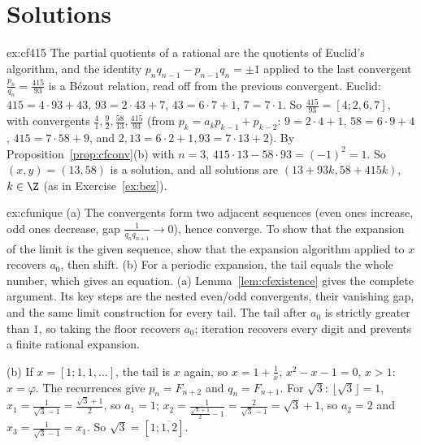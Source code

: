 \section{Solutions}

\begin{solution}{ex:cf415}
\idea The partial quotients of a rational are the quotients of Euclid's algorithm, and the identity $p_nq_{n-1}-p_{n-1}q_n=\pm1$ applied to the last convergent $\frac{p_n}{q_n}=\frac{415}{93}$ is a B\'ezout relation, read off from the previous convergent.
\writeup Euclid: $415=4\cdot93+43$, $93=2\cdot43+7$, $43=6\cdot7+1$, $7=7\cdot1$. So $\frac{415}{93}=[4;2,6,7]$, with convergents $\frac41,\frac92,\frac{58}{13},\frac{415}{93}$ (from $p_k=a_kp_{k-1}+p_{k-2}$: $9=2\cdot4+1$, $58=6\cdot9+4$, $415=7\cdot58+9$, and $2,13=6\cdot2+1,93=7\cdot13+2$). By Proposition~\ref{prop:cfconv}(b) with $n=3$, $415\cdot13-58\cdot93=(-1)^2=1$. So $(x,y)=(13,58)$ is a solution, and all solutions are $(13+93k,58+415k)$, $k\in\Z$ (as in Exercise~\ref{ex:bez}).
\end{solution}

\begin{solution}{ex:cfunique}
\idea (a) The convergents form two adjacent sequences (even ones increase, odd ones decrease, gap $\frac1{q_nq_{n+1}}\to0$), hence converge. To show that the expansion of the limit is the given sequence, show that the expansion algorithm applied to $x$ recovers $a_0$, then shift. (b) For a periodic expansion, the tail equals the whole number, which gives an equation.
\writeup (a) Lemma~\ref{lem:cfexistence} gives the complete argument.
Its key steps are the nested even/odd convergents, their vanishing gap,
and the same limit construction for every tail. The tail after $a_0$
is strictly greater than $1$, so taking the floor recovers $a_0$;
iteration recovers every digit and prevents a finite rational expansion.


(b) If $x=[1;1,1,\dots]$, the tail is $x$ again, so $x=1+\frac1x$, $x^2-x-1=0$, $x>1$: $x=\varphi$. The recurrences give $p_n=F_{n+2}$ and $q_n=F_{n+1}$. For $\sqrt3$: $\lfloor\sqrt3\rfloor=1$, $x_1=\frac1{\sqrt3-1}=\frac{\sqrt3+1}2$, so $a_1=1$; $x_2=\frac1{\frac{\sqrt3+1}2-1}=\frac2{\sqrt3-1}=\sqrt3+1$, so $a_2=2$ and $x_3=\frac1{\sqrt3-1}=x_1$. So $\sqrt3=[1;\overline{1,2}]$.
\end{solution}

